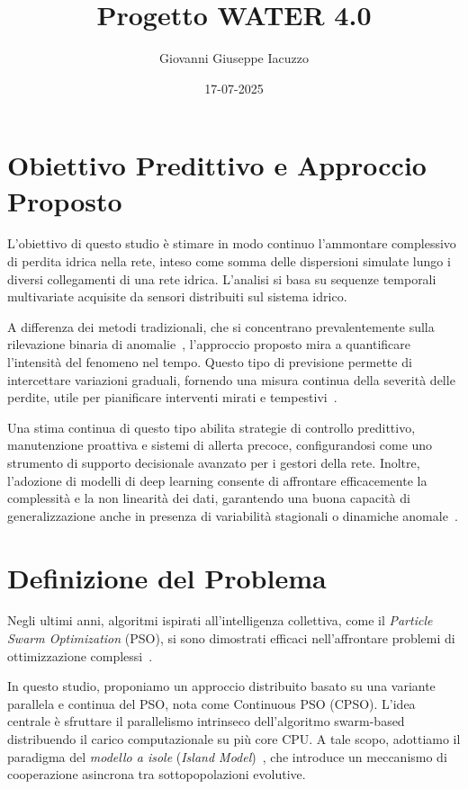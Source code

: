 \documentclass{article}
\title{Progetto WATER 4.0}
\author{Giovanni Giuseppe Iacuzzo}
\date{17-07-2025}
\begin{document}
\sloppy
\maketitle

\section{Obiettivo Predittivo e Approccio Proposto}

L'obiettivo di questo studio è stimare in modo continuo l’ammontare complessivo di perdita idrica 
nella rete, inteso come somma delle dispersioni simulate lungo i diversi collegamenti di una rete idrica. 
L’analisi si basa su sequenze temporali multivariate acquisite da sensori distribuiti sul sistema idrico.

A differenza dei metodi tradizionali, che si concentrano prevalentemente sulla rilevazione binaria 
di anomalie~\cite{piller2020}, l’approccio proposto mira a quantificare l’intensità del fenomeno 
nel tempo. Questo tipo di previsione permette di intercettare variazioni graduali, fornendo una 
misura continua della severità delle perdite, utile per pianificare interventi mirati e 
tempestivi~\cite{candelieri2016, soldevila2016leak}.

Una stima continua di questo tipo abilita strategie di controllo predittivo, manutenzione proattiva 
e sistemi di allerta precoce, configurandosi come uno strumento di supporto decisionale avanzato 
per i gestori della rete. Inoltre, l’adozione di modelli di deep learning consente di 
affrontare efficacemente la complessità e la non linearità dei dati, garantendo una buona 
capacità di generalizzazione anche in presenza di variabilità stagionali o dinamiche anomale~\cite{bao2019}.

\section{Definizione del Problema}

Negli ultimi anni, algoritmi ispirati all’intelligenza collettiva, come il \textit{Particle Swarm Optimization} 
(PSO), si sono dimostrati efficaci nell'affrontare problemi di ottimizzazione complessi~\cite{kennedy1995particle, 
eberhart2001pso}. 

In questo studio, proponiamo un approccio distribuito basato su una variante parallela e 
continua del PSO, nota come Continuous PSO (CPSO). L’idea centrale è sfruttare il parallelismo 
intrinseco dell’algoritmo swarm-based distribuendo il carico computazionale su più core CPU. A tale 
scopo, adottiamo il paradigma del \textit{modello a isole} (\textit{Island Model})~\cite{cantupaz1998survey, 
tomassini2005spatially}, che introduce un meccanismo di cooperazione asincrona tra sottopopolazioni 
evolutive.
\end{document}
